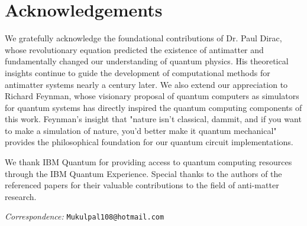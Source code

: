 \documentclass[10pt,twocolumn,a4paper]{article}
\begin{document}
\section{Acknowledgements}
We gratefully acknowledge the foundational contributions of Dr. Paul Dirac, whose revolutionary equation predicted the existence of antimatter and fundamentally changed our understanding of quantum physics. His theoretical insights continue to guide the development of computational methods for antimatter systems nearly a century later. We also extend our appreciation to Richard Feynman, whose visionary proposal of quantum computers as simulators for quantum systems has directly inspired the quantum computing components of this work. Feynman's insight that "nature isn't classical, dammit, and if you want to make a simulation of nature, you'd better make it quantum mechanical" provides the philosophical foundation for our quantum circuit implementations.

We thank IBM Quantum for providing access to quantum computing resources through the IBM Quantum Experience. Special thanks to the authors of the referenced papers for their valuable contributions to the field of anti-matter research.




\vspace{1em}
\noindent\textit{Correspondence:} \texttt{Mukulpal108@hotmail.com}
\end{document}

